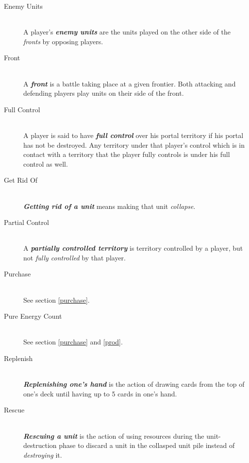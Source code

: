 \documentclass[a4paper]{article}
\begin{document}
\begin{description}
        \item[Enemy Units] \hfill \\
            A player's \textbf{\textit{enemy units}} are the units played on the other side
            of the \textit{fronts} by opposing players.
            
        \item[Front] \hfill \\
            A \textbf{\textit{front}} is a battle taking place at a given frontier.
            Both attacking and defending players play units on their side of the front.
            
        \item[Full Control] \hfill \\
            A player is said to have \textbf{\textit{full control}} over his portal territory
            if his portal has not be destroyed.
            Any territory under that player's control which is in contact with
            a territory that the player fully controls is under his full control as well.
            
        \item[Get Rid Of] \hfill \\
            \textbf{\textit{Getting rid of a unit}} means making that unit
            \textit{collapse}.
            
        \item[Partial Control] \hfill \\
            A \textbf{\textit{partially controlled territory}} is territory controlled
            by a player, but not \textit{fully controlled} by that player.
            
        \item[Purchase] \hfill \\
            See section \ref{purchase}.
            
        \item[Pure Energy Count] \hfill \\
            See section \ref{purchase} and \ref{prod}.
            
        \item[Replenish] \hfill \\
            \textbf{\textit{Replenishing one's hand}} is the action of drawing
            cards from the top of one's deck until having up to 5 cards in one's hand.
            
        \item[Rescue] \hfill \\
            \textbf{\textit{Rescuing a unit}} is the action of using resources
            during the unit-destruction phase to discard a unit in the collasped unit
            pile instead of \textit{destroying} it.
            

\end{description}
\end{document}
